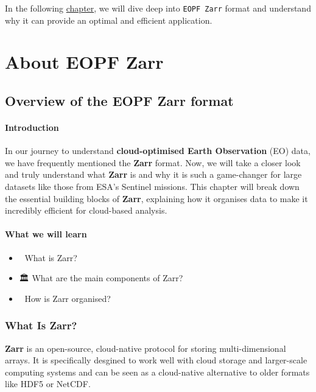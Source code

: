 \documentclass[
  letterpaper,
  DIV=11,
  numbers=noendperiod]{scrreprt}
\providecommand{\tightlist}{%
  \setlength{\itemsep}{0pt}\setlength{\parskip}{0pt}}
\begin{document}
In the following \href{21_what_is_zarr.qmd}{chapter}, we will dive deep
into \texttt{EOPF\ Zarr} format and understand why it can provide an
optimal and efficient application.

\part{\textbf{About EOPF Zarr}}

\chapter{Overview of the EOPF Zarr
format}\label{overview-of-the-eopf-zarr-format}

\subsection{Introduction}\label{introduction-3}

In our journey to understand \textbf{cloud-optimised Earth Observation}
(EO) data, we have frequently mentioned the \textbf{Zarr} format. Now,
we will take a closer look and truly understand what \textbf{Zarr} is
and why it is such a game-changer for large datasets like those from
ESA's Sentinel missions. This chapter will break down the essential
building blocks of \textbf{Zarr}, explaining how it organises data to
make it incredibly efficient for cloud-based analysis.

\subsection{What we will learn}\label{what-we-will-learn-2}

\begin{itemize}
\tightlist
\item
  🔗 What is Zarr?
\item
  🏛️ What are the main components of Zarr?
\item
  🧱 How is Zarr organised?
\end{itemize}

\section{What Is Zarr?}\label{what-is-zarr}

\textbf{Zarr} is an open-source, cloud-native protocol for storing
multi-dimensional arrays. It is specifically desgined to work well with
cloud storage and larger-scale computing systems and can be seen as a
cloud-native alternative to older formats like HDF5 or NetCDF.
\end{document}
